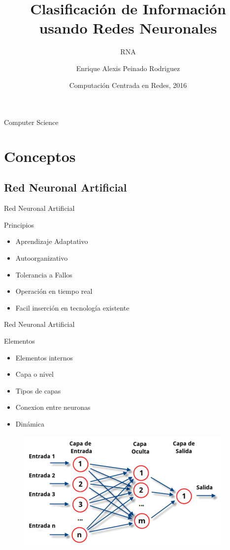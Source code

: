 \documentclass{beamer}
\title{Clasificación de Información usando Redes Neuronales}
\subtitle{RNA}
\author{Enrique Alexis Peinado Rodriguez}
\institute[Universidad Naciona De Ingenieria]
{
  Ciencia de la Computación\\
  Universidad Nacional de Ingeniería
}
\date{Computación Centrada en Redes, 2016}
\begin{document}
\begin{frame}
  \titlepage
\end{frame}

\begin{frame}{Computer Science}
  \tableofcontents
\end{frame}

\section{Conceptos}

\subsection{Red Neuronal Artificial}

\begin{frame}{Red Neuronal Artificial}
\begin{block}{Principios}\pause
\begin{itemize}
\item {Aprendizaje Adaptativo\pause}
\item {Autoorganizativo\pause}
\item {Tolerancia a Fallos\pause}
\item {Operación en tiempo real\pause}
\item {Facil inserción en tecnología existente}
\end{itemize}
\end{block}
\end{frame}

\begin{frame}{Red Neuronal Artificial}
\begin{block}{Elementos}\pause
\begin{itemize}
\item {Elementos internos\pause}
\item {Capa o nivel\pause}
\item {Tipos de capas\pause}
\item {Conexion entre neuronas\pause}
\item {Dinámica}
\end{itemize}
\begin{figure}
\includegraphics[scale=0.6]{elementos.png}
\centering
\end{figure}
\end{block}
\end{frame}
\end{document}
